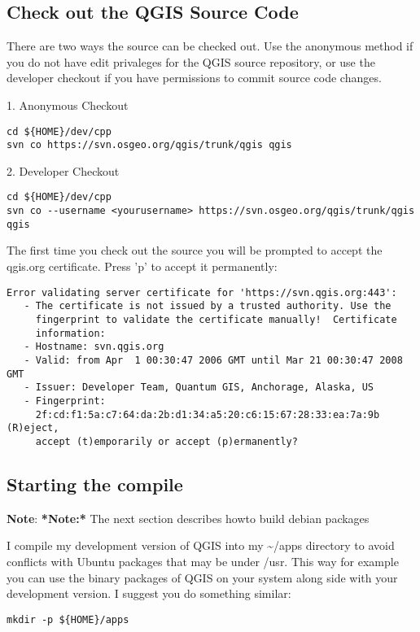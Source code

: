 \subsection{Check out the QGIS Source Code}
There are two ways the source can be checked out. Use the anonymous method
if you do not have edit privaleges for the QGIS source repository, or use
  the developer checkout if you have permissions to commit source code
  changes.

1. Anonymous Checkout

\begin{verbatim}
cd ${HOME}/dev/cpp 
svn co https://svn.osgeo.org/qgis/trunk/qgis qgis
\end{verbatim}

2. Developer Checkout

\begin{verbatim}
cd ${HOME}/dev/cpp 
svn co --username <yourusername> https://svn.osgeo.org/qgis/trunk/qgis qgis 
\end{verbatim}

The first time you check out the source you will be prompted to accept the
qgis.org certificate. Press 'p' to accept it permanently:

\begin{verbatim}
Error validating server certificate for 'https://svn.qgis.org:443':
   - The certificate is not issued by a trusted authority. Use the
     fingerprint to validate the certificate manually!  Certificate
     information:
   - Hostname: svn.qgis.org
   - Valid: from Apr  1 00:30:47 2006 GMT until Mar 21 00:30:47 2008 GMT
   - Issuer: Developer Team, Quantum GIS, Anchorage, Alaska, US
   - Fingerprint:
     2f:cd:f1:5a:c7:64:da:2b:d1:34:a5:20:c6:15:67:28:33:ea:7a:9b (R)eject,
     accept (t)emporarily or accept (p)ermanently?  
\end{verbatim}

\subsection{Starting the compile}
\textbf{Note}:   \textbf{*Note:*} The next section describes howto build debian packages

I compile my development version of QGIS into my \~{}/apps directory to avoid
conflicts with Ubuntu packages that may be under /usr. This way for example
you can use the binary packages of QGIS on your system along side with your
development version. I suggest you do something similar:

\begin{verbatim}
mkdir -p ${HOME}/apps 
\end{verbatim}


